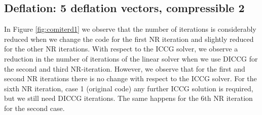 \documentclass[12pt]{report}
\begin{document}
% 
% 
% 
% 
% 
% 
% 
% 

\subsection*{Deflation: 5 deflation vectors, compressible 2}
In Figure \ref{fig:comiterd1} we observe that the number of iterations is considerably reduced when we change the code for the first NR iteration
and slightly reduced for the other NR iterations. With respect to the ICCG solver, we observe a reduction in the number of
iterations of the linear solver when we use DICCG for the  second and third NR-iteration. 
However, we observe that for the first
and second NR iterations there is no change with respect to the ICCG solver.
For the sixth NR iteration, case 1 (original code) any further ICCG solution is required, 
but we still need DICCG iterations. The same happens for the 6th NR iteration for the 
second case. \\
\end{document}
